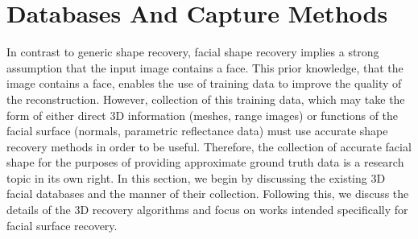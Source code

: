 \section{Databases And Capture Methods}\label{sec:bg_db_capture}
In contrast to generic shape recovery, facial shape recovery implies a strong
assumption that the input image contains a face. This prior knowledge, that the
image contains a face, enables the use of training data to improve the
quality of the reconstruction. However, collection of this training data, which
may take the form of either direct 3D information (meshes, range images) or
functions of the facial surface (normals, parametric reflectance data) must
use accurate shape recovery methods in order to be useful. Therefore, the
collection of accurate facial shape for the purposes of providing approximate
ground truth data is a research topic in its own right. In this section, we
begin by discussing the existing 3D facial databases and the manner of their
collection. Following this, we discuss the details of the 3D recovery algorithms
and focus on works intended specifically for facial surface recovery.
